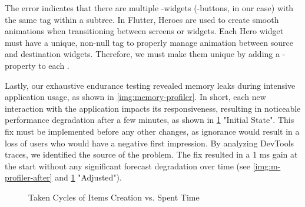 \noindent The error indicates that there are multiple -widgets (-buttons, in our case) 
with the same tag within a subtree. In Flutter, Heroes are used to create smooth animations when transitioning between 
screens or widgets. Each Hero widget must have a unique, non-null tag to properly manage animation between source and 
destination widgets. Therefore, we must make them unique by adding a -property to each .

Lastly, our exhaustive endurance testing revealed memory leaks during intensive application usage, as shown in 
\cref{img:memory-profiler}. In short, each new interaction with the application impacts its responsiveness, resulting in 
noticeable performance degradation after a few minutes, as shown in \cref{gr:taken-cycle} "Initial State". This fix must 
be implemented before any other changes, as ignorance would result in a loss of users who would have a negative first 
impression. By analyzing DevTools traces, we identified the source of the problem. The fix resulted in a 1 ms gain at 
the start without any significant forecast degradation over time (see \cref{img:m-profiler-after} and 
\cref{gr:taken-cycle} "Adjusted").


\begin{figure}
\caption{Taken Cycles of Items Creation vs. Spent Time} \label{gr:taken-cycle}
\end{figure}
